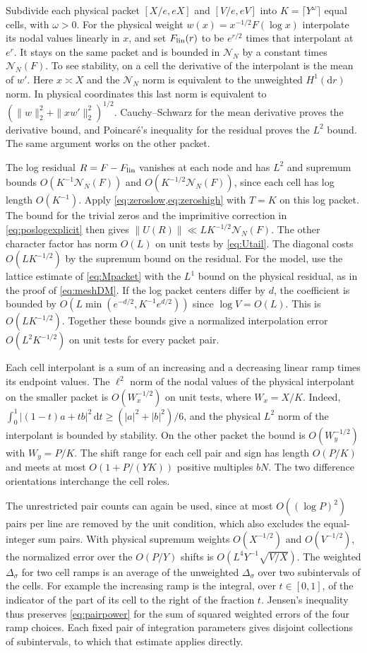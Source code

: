 \documentclass[11pt,a4paper]{article}
\numberwithin{equation}{section}
\newcommand{\ud}{\mathrm d}
\newcommand{\NN}{\mathcal N_N}
\begin{document}
Subdivide each physical packet $[X/e,eX]$ and $[V/e,eV]$
into $K=\lceil Y^\omega\rceil$ equal cells, with $\omega>0$.
For the physical weight $w(x)=x^{-1/2}F(\log x)$ interpolate
its nodal values linearly in $x$, and set $F_{\rm lin}(r)$
to be $e^{r/2}$ times that interpolant at $e^r$.
It stays on the same packet and is bounded in $\NN$ by a
constant times $\NN(F)$. To see stability, on a cell the
derivative of the interpolant is the mean of $w'$.
Here $x\asymp X$ and the $\NN$ norm is equivalent to the
unweighted $H^1(\ud r)$ norm. In physical coordinates this
last norm is equivalent to
$(\|w\|_2^2+\|xw'\|_2^2)^{1/2}$. Cauchy--Schwarz for
the mean derivative proves the derivative bound, and
Poincar\'e's inequality for the residual proves the $L^2$
bound. The same argument works on the other packet.

The log residual $R=F-F_{\rm lin}$ vanishes at each node and
has $L^2$ and supremum bounds $O(K^{-1}\NN(F))$ and
$O(K^{-1/2}\NN(F))$, since each cell has log length $O(K^{-1})$.
Apply \cref{eq:zeroslow,eq:zeroshigh} with $T=K$ on this log
packet. The bound for the trivial zeros and the imprimitive
correction in \cref{eq:poslogexplicit} then gives
$\|U(R)\|\ll L K^{-1/2}\NN(F)$. The other character factor
has norm $O(L)$ on unit tests by \cref{eq:Utail}.
The diagonal costs $O(LK^{-1/2})$ by the supremum bound
on the residual. For the model, use the lattice estimate
of \cref{eq:Mpacket} with the $L^1$ bound on the physical
residual, as in the proof of \cref{eq:meshDM}. If the
log packet centers differ by $d$, the coefficient is bounded
by $O(L\min(e^{-d/2},K^{-1}e^{d/2}))$ since
$\log V=O(L)$. This is $O(LK^{-1/2})$.
Together these bounds give a normalized interpolation error
$O(L^2 K^{-1/2})$ on unit tests for every packet pair.

Each cell interpolant is a sum of an increasing and a
decreasing linear ramp times its endpoint values.
The $\ell^2$ norm of the nodal values of the physical
interpolant on the smaller packet is $O(W_x^{-1/2})$ on unit
tests, where $W_x=X/K$. Indeed,
$\int_0^1|(1-t)a+tb|^2\,\ud t\ge(|a|^2+|b|^2)/6$,
and the physical $L^2$ norm of the interpolant is bounded by
stability. On the other packet the bound is $O(W_y^{-1/2})$
with $W_y=P/K$. The shift range for each cell pair and sign
has length $O(P/K)$ and meets at most $O(1+P/(YK))$ positive
multiples $bN$. The two difference orientations interchange
the cell roles.

The unrestricted pair counts can again be used, since at
most $O((\log P)^2)$ pairs per line are removed by the unit
condition, which also excludes the equal-integer sum pairs.
With physical supremum weights $O(X^{-1/2})$ and
$O(V^{-1/2})$, the normalized error over the $O(P/Y)$ shifts
is $O(L^4Y^{-1}\sqrt{V/X})$.
The weighted $\Delta_\sigma$ for two cell ramps is an average
of the unweighted $\Delta_\sigma$ over two subintervals of
the cells. For example the increasing ramp is the integral,
over $t\in[0,1]$, of the indicator of the part of its cell
to the right of the fraction $t$. Jensen's inequality thus
preserves \cref{eq:pairpower} for the sum of squared weighted
errors of the four ramp choices. Each fixed pair of
integration parameters gives disjoint collections of
subintervals, to which that estimate applies directly.
\end{document}
